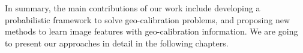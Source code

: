 
In summary, the main contributions of our work include developing a
probabilistic framework to solve geo-calibration problems, and
proposing new methods to learn image features with geo-calibration
information. We are going to present our approaches in detail in the
following chapters.

